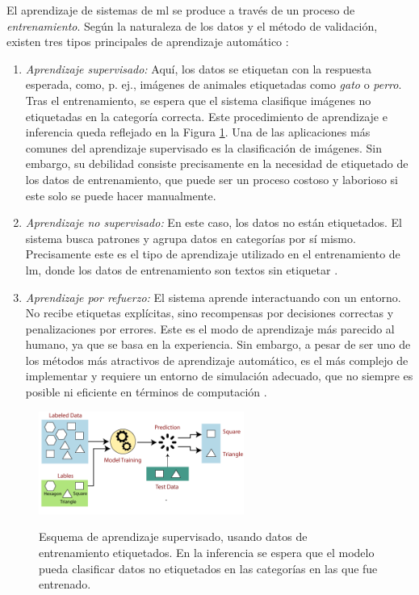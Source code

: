 El aprendizaje de sistemas de \gls{ml} se produce a través de un proceso de \emph{entrenamiento}. Según la naturaleza de los datos y el método de validación, existen tres tipos principales de aprendizaje automático \citep[p. ~38]{torresivinalsPythonDeepLearning2020}:

\begin{enumerate}
    \item \emph{Aprendizaje supervisado:} Aquí, los datos se etiquetan con la respuesta esperada, como, p. ej., imágenes de animales etiquetadas como \emph{gato} o \emph{perro}. Tras el entrenamiento, se espera que el sistema clasifique imágenes no etiquetadas en la categoría correcta. Este procedimiento de aprendizaje e inferencia queda reflejado en la Figura \ref{fig:labeled_data_training}. Una de las aplicaciones más comunes del aprendizaje supervisado es la clasificación de imágenes. Sin embargo, su debilidad consiste precisamente en la necesidad de etiquetado de los datos de entrenamiento, que puede ser un proceso costoso y laborioso si este solo se puede hacer manualmente.
    
    \item \emph{Aprendizaje no supervisado:} En este caso, los datos no están etiquetados. El sistema busca patrones y agrupa datos en categorías por sí mismo. Precisamente este es el tipo de aprendizaje utilizado en el entrenamiento de \gls{lm}, donde los datos de entrenamiento son textos sin etiquetar \citep{radfordLanguageModelsAre2019}.
    
    \item \emph{Aprendizaje por refuerzo:} El sistema aprende interactuando con un entorno. No recibe etiquetas explícitas, sino recompensas por decisiones correctas y penalizaciones por errores. Este es el modo de aprendizaje más parecido al humano, ya que se basa en la experiencia. Sin embargo, a pesar de ser uno de los métodos más atractivos de aprendizaje automático, es el más complejo de implementar y requiere un entorno de simulación adecuado, que no siempre es posible ni eficiente en términos de computación \citep{mohanStructureReinforcementLearning2023}.
\end{enumerate}

\begin{figure}[H]
    \caption[Esquema de aprendizaje supervisado]{Esquema de aprendizaje supervisado, usando datos de entrenamiento etiquetados. En la inferencia se espera que el modelo pueda clasificar datos no etiquetados en las categorías en las que fue entrenado.}
    \centering
    \includegraphics[width=0.6\textwidth]{./figuras/labeled_data_training.png}
    \label{fig:labeled_data_training}
\end{figure}


